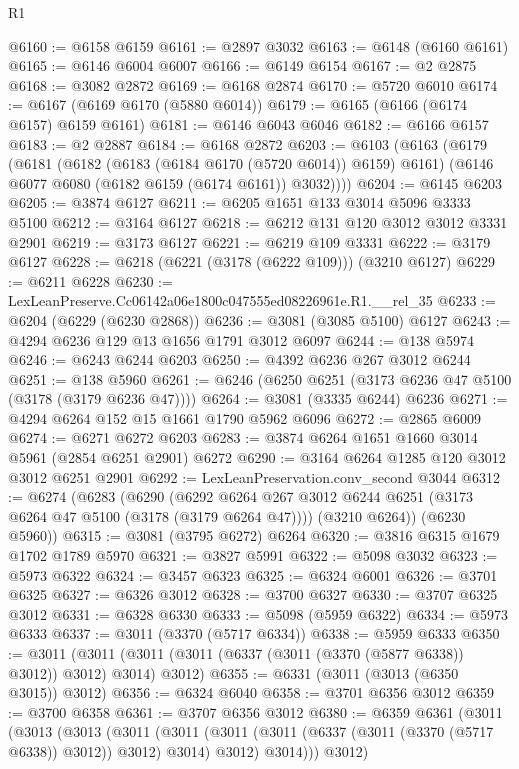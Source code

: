 \begin{lexlean}{R1}
\begin{coremodule}
@6160 := @6158 @6159
@6161 := @2897 @3032
@6163 := @6148 (@6160 @6161)
@6165 := @6146 @6004 @6007
@6166 := @6149 @6154
@6167 := @2 @2875
@6168 := @3082 @2872
@6169 := @6168 @2874
@6170 := @5720 @6010
@6174 := @6167 (@6169 @6170 (@5880 @6014))
@6179 := @6165 (@6166 (@6174 @6157) @6159 @6161)
@6181 := @6146 @6043 @6046
@6182 := @6166 @6157
@6183 := @2 @2887
@6184 := @6168 @2872
@6203 := @6103
    (@6163
      (@6179
        (@6181
          (@6182 (@6183 (@6184 @6170 (@5720 @6014)) @6159) @6161)
          (@6146 @6077 @6080 (@6182 @6159 (@6174 @6161)) @3032))))
@6204 := @6145 @6203
@6205 := @3874 @6127
@6211 := @6205 @1651 @133 @3014 @5096 @3333 @5100
@6212 := @3164 @6127
@6218 := @6212 @131 @120 @3012 @3012 @3331 @2901
@6219 := @3173 @6127
@6221 := @6219 @109 @3331
@6222 := @3179 @6127
@6228 := @6218 (@6221 (@3178 (@6222 @109))) (@3210 @6127)
@6229 := @6211 @6228
@6230 := LexLeanPreserve.Cc06142a06e1800c047555ed08226961e.R1.__rel_35
@6233 := @6204 (@6229 (@6230 @2868))
@6236 := @3081 (@3085 @5100) @6127
@6243 := @4294 @6236 @129 @13 @1656 @1791 @3012 @6097
@6244 := @138 @5974
@6246 := @6243 @6244 @6203
@6250 := @4392 @6236 @267 @3012 @6244
@6251 := @138 @5960
@6261 := @6246 (@6250 @6251 (@3173 @6236 @47 @5100 (@3178 (@3179 @6236 @47))))
@6264 := @3081 (@3335 @6244) @6236
@6271 := @4294 @6264 @152 @15 @1661 @1790 @5962 @6096
@6272 := @2865 @6009
@6274 := @6271 @6272 @6203
@6283 := @3874 @6264 @1651 @1660 @3014 @5961 (@2854 @6251 @2901) @6272
@6290 := @3164 @6264 @1285 @120 @3012 @3012 @6251 @2901
@6292 := LexLeanPreservation.conv_second @3044
@6312 := @6274
    (@6283
      (@6290
        (@6292 @6264 @267 @3012 @6244 @6251 (@3173 @6264 @47 @5100 (@3178 (@3179 @6264 @47))))
        (@3210 @6264))
      (@6230 @5960))
@6315 := @3081 (@3795 @6272) @6264
@6320 := @3816 @6315 @1679 @1702 @1789 @5970
@6321 := @3827 @5991
@6322 := @5098 @3032
@6323 := @5973 @6322
@6324 := @3457 @6323
@6325 := @6324 @6001
@6326 := @3701 @6325
@6327 := @6326 @3012
@6328 := @3700 @6327
@6330 := @3707 @6325 @3012
@6331 := @6328 @6330
@6333 := @5098 (@5959 @6322)
@6334 := @5973 @6333
@6337 := @3011 (@3370 (@5717 @6334))
@6338 := @5959 @6333
@6350 := @3011 (@3011 (@3011 (@3011 (@6337 (@3011 (@3370 (@5877 @6338)) @3012)) @3012) @3014) @3012)
@6355 := @6331 (@3011 (@3013 (@6350 @3015)) @3012)
@6356 := @6324 @6040
@6358 := @3701 @6356 @3012
@6359 := @3700 @6358
@6361 := @3707 @6356 @3012
@6380 := @6359
    @6361
    (@3011
      (@3013
        (@3013
          (@3011
            (@3011 (@3011 (@3011 (@6337 (@3011 (@3370 (@5717 @6338)) @3012)) @3012) @3014) @3012)
            @3014)))
      @3012)

\end{coremodule}
\end{lexlean}
